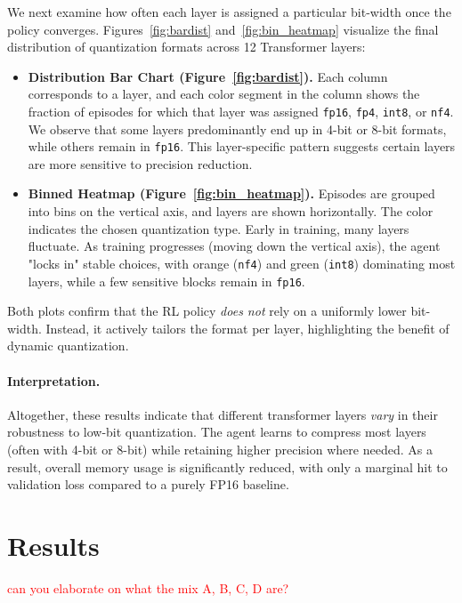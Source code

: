 \documentclass{article}
\newcommand{\red}[1]{\textcolor{red}{#1}}
\begin{document}
	We next examine how often each layer is assigned a particular bit-width once the policy converges. Figures~\ref{fig:bardist} and~\ref{fig:bin_heatmap} visualize the final distribution of quantization formats across 12 Transformer layers:
	
	\begin{itemize}
		\item \textbf{Distribution Bar Chart (Figure~\ref{fig:bardist}).} Each column corresponds to a layer, and each color segment in the column shows the fraction of episodes for which that layer was assigned \texttt{fp16}, \texttt{fp4}, \texttt{int8}, or \texttt{nf4}. We observe that some layers predominantly end up in 4-bit or 8-bit formats, while others remain in \texttt{fp16}. This layer-specific pattern suggests certain layers are more sensitive to precision reduction.
		\item \textbf{Binned Heatmap (Figure~\ref{fig:bin_heatmap}).} Episodes are grouped into bins on the vertical axis, and layers are shown horizontally. The color indicates the chosen quantization type. Early in training, many layers fluctuate. As training progresses (moving down the vertical axis), the agent "locks in" stable choices, with orange (\texttt{nf4}) and green (\texttt{int8}) dominating most layers, while a few sensitive blocks remain in \texttt{fp16}.
	\end{itemize}
	
	Both plots confirm that the RL policy \emph{does not} rely on a uniformly lower bit-width. Instead, it actively tailors the format per layer, highlighting the benefit of dynamic quantization.
	
	\paragraph{Interpretation.}
	Altogether, these results indicate that different transformer layers \emph{vary} in their robustness to low-bit quantization. The agent learns to compress most layers (often with 4-bit or 8-bit) while retaining higher precision where needed. As a result, overall memory usage is significantly reduced, with only a marginal hit to validation loss compared to a purely FP16 baseline.
			
	
	\section{Results}
	
	\red{can you elaborate on what the mix A, B, C, D are?}
	
\end{document}
